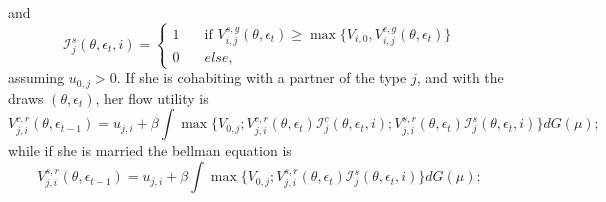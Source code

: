 \documentclass[12pt]{article}
\begin{document}
and
\begin{equation}
\mathcal{I}^s_j(\theta,\epsilon_t,i)=
\begin{cases}
1       & \quad \text{if }V^{s,g}_{i,j}(\theta,\epsilon_t) \geq\max\big\{V_{i,0},V^{c,g}_{i,j}(\theta,\epsilon_t)\big\}\\
0  & \quad else,
\end{cases}
\end{equation}
assuming $u_{0,j}>0$. If she is cohabiting with a partner of the type $j$, and with the draws $(\theta,\epsilon_t)$, her flow utility is
\begin{equation}\label{eq:vco}
V^{c,r}_{j,i}(\theta,\epsilon_{t-1})=u_{j,i}+ \beta\int\max\bigg\{V_{0,j};V^{c,r}_{j,i}(\theta,\epsilon_t)\mathcal{I}_j^c(\theta,\epsilon_t,i);V^{s,r}_{j,i}(\theta,\epsilon_t)\mathcal{I}_j^s(\theta,\epsilon_t,i)\bigg\} dG(\mu);
\end{equation}
while if she is married the bellman equation is
\begin{equation}\label{eq:vsp}
V^{s,r}_{j,i}(\theta,\epsilon_{t-1})=u_{j,i}+ \beta\int\max\bigg\{V_{0,j};V^{s,r}_{j,i}(\theta,\epsilon_t)\mathcal{I}_j^s(\theta,\epsilon_t,i)\bigg\} dG(\mu);
\end{equation}

%

\end{document}
